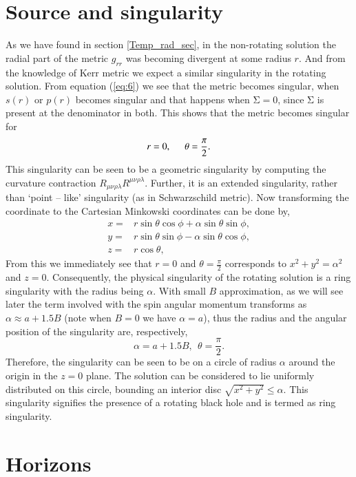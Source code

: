 \documentclass[12pt,a4paper,oneside]{book}
\newcommand{\eq}[2]{\begin{equation} \label{eq:#1} #2 \end{equation}}
\newcommand{\Eref}[1]{(\ref{eq:#1})}
\begin{document}
\section{Source and singularity}\label{Sec_Source_Sing}
As we have found in section \ref{Temp_rad_sec}, in the non-rotating solution the radial part of the metric $g_{rr}$ was becoming divergent at some radius $r$. And from the knowledge of Kerr metric we expect a similar singularity in the rotating solution. From equation \Eref{6} we see that the metric becomes singular, when $s(r)$ or $p(r)$ becomes singular and that happens when $\mathrm{\Sigma }=0$, since $\mathrm{\Sigma }$ is present at the denominator in both. This shows that the metric becomes singular for \cite{Source_and_singularity}
\[r=0,\hspace{0.5cm} \theta =\frac{\pi }{2}.\] 
This singularity can be seen to be a geometric singularity by computing the curvature contraction $R_{\mu \nu \rho \lambda }R^{\mu \nu \rho \lambda }$. Further, it is an extended singularity, rather than `point -- like' singularity (as in Schwarzschild metric). 
Now transforming the coordinate to the Cartesian Minkowski coordinates can be done by,
\begin{align*}
    x =& r \sin{\theta} \cos{\phi} + \alpha \sin{\theta}\sin{\phi},\\
    y =& r \sin{\theta}\sin{\phi} -\alpha \sin{\theta}\cos{\phi},\\
    z =& r\cos{\theta},
\end{align*}
From this we immediately see that $r=0$ and $\theta =\frac{\pi }{2}$ corresponds to $x^2+y^2 = \alpha^2$ and $z=0$. Consequently, the physical singularity of the rotating solution is a ring singularity with the radius being $\alpha$. With small $B$ approximation, as we will see later the term involved with the spin angular momentum transforms as $\alpha \approx a + 1.5B$ (note when $B=0$ we have $\alpha = a$), thus the radius and the angular position of the singularity are, respectively,
\eq{12}{\alpha = a + 1.5B,\ \ \theta =\frac{\pi }{2}.}
\noindent Therefore, the singularity can be seen to be on a circle of radius $\alpha$ around the origin in the $z=0$ plane. The solution can be considered to lie uniformly distributed on this circle, bounding an interior disc $\sqrt{x^2+y^2}\le\alpha$. This singularity signifies the presence of a rotating black hole and is termed as ring singularity.


\section{Horizons}\label{Sec_Hor}
\end{document}
